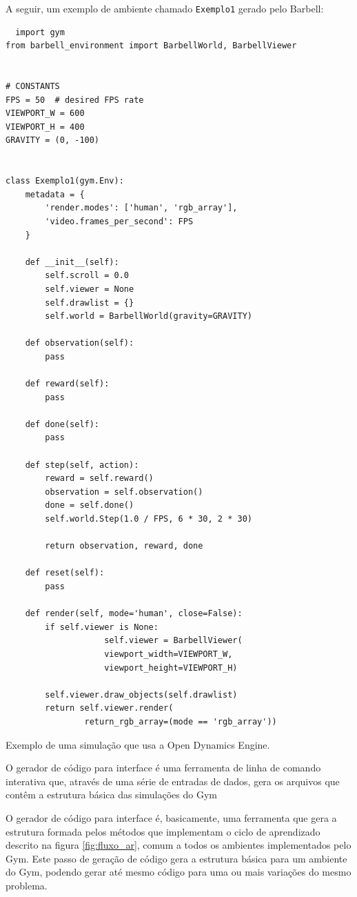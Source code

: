 \documentclass[cic,tc]{iiufrgs}
\newenvironment{longlisting}{\captionsetup{type=listing}}{}
\begin{document}
A seguir, um exemplo de ambiente chamado \texttt{Exemplo1} gerado pelo Barbell:
\begin{longlisting}
\begin{verbatim}
  import gym
from barbell_environment import BarbellWorld, BarbellViewer


# CONSTANTS
FPS = 50  # desired FPS rate
VIEWPORT_W = 600
VIEWPORT_H = 400
GRAVITY = (0, -100)


class Exemplo1(gym.Env):
    metadata = {
        'render.modes': ['human', 'rgb_array'],
        'video.frames_per_second': FPS
    }

    def __init__(self):
        self.scroll = 0.0
        self.viewer = None
        self.drawlist = {}
        self.world = BarbellWorld(gravity=GRAVITY)

    def observation(self):
        pass

    def reward(self):
        pass

    def done(self):
        pass

    def step(self, action):
        reward = self.reward()
        observation = self.observation()
        done = self.done()
        self.world.Step(1.0 / FPS, 6 * 30, 2 * 30)

        return observation, reward, done

    def reset(self):
        pass

    def render(self, mode='human', close=False):
        if self.viewer is None:
                    self.viewer = BarbellViewer(
                    viewport_width=VIEWPORT_W,
                    viewport_height=VIEWPORT_H)

        self.viewer.draw_objects(self.drawlist)
        return self.viewer.render(
                return_rgb_array=(mode == 'rgb_array'))

\end{verbatim}
\caption[]{Exemplo de uma simulação que usa a Open Dynamics Engine.}
\label{ode_example}
\end{longlisting}


O gerador de código para
interface é uma ferramenta de linha de comando interativa que, através de uma
série de entradas de dados, gera os arquivos que contêm a estrutura básica das
simulações do Gym


O gerador de código para interface é, basicamente, uma ferramenta que gera a
estrutura formada pelos métodos que implementam o ciclo de aprendizado descrito
na figura \ref{fig:fluxo_ar}, comum a todos os ambientes implementados pelo Gym.
Este passo de geração de código gera a estrutura básica para um ambiente do Gym,
podendo gerar até mesmo código para uma ou mais variações do mesmo problema.
\end{document}
